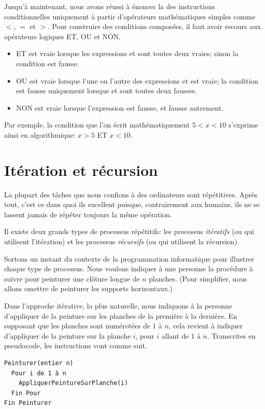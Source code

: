 Jusqu'à maintenant, nous avons réussi à énoncer la 
des instructions conditionnelles uniquement à partir d'opérateurs
mathématiques simples comme $<$, $=$ et $>$. Pour construire des
conditions composées, il faut avoir recours aux opérateurs logiques
ET, OU et NON.
\begin{itemize}
\item {} ET  est vraie lorsque les expressions
   et  sont toutes deux vraies; sinon la
  condition est fausse.
\item {} OU  est vraie lorsque l'une ou l'autre
  des expressions  et  est vraie; la condition
  est fausse uniquement lorsque  et  sont
  toutes deux fausses.
\item NON  est vraie lorsque l'expression  est fausse,
  et fausse autrement.
\end{itemize}

Par exemple, la condition que l'on écrit mathématiquement $5 < x < 10$
s'exprime ainsi en algorithmique: $x > 5$ ET $x < 10$.


\section{Itération et récursion}
\label{sec:algorithmes:iteration}

La plupart des tâches que nous confions à des ordinateurs sont
répétitives. Après tout, c'est ce dans quoi ils excellent puisque,
contrairement aux humains, ils ne se lassent jamais de répéter
toujours la même opération.

Il existe deux grands types de processus répétitifs: les processus
\emph{itératifs} (ou qui utilisent
l'itération) et les processus
\emph{récursifs} (ou qui utilisent la
récursion).

Sortons un instant du contexte de la programmation informatique pour
illustrer chaque type de processus. Nous voulons indiquer à une
personne la procédure à suivre pour peinturer une clôture longue de
$n$ planches. (Pour simplifier, nous allons omettre de peinturer les
supports horizontaux.)

Dans l'approche itérative, la plus naturelle, nous indiquons à la
personne d'appliquer de la peinture sur les planches de la première à
la dernière. En supposant que les planches sont numérotées de $1$ à
$n$, cela revient à indiquer d'appliquer de la peinture sur la planche
$i$, pour $i$ allant de $1$ à $n$. Transcrites en pseudocode, les
instructions vont comme suit.
\begin{pseudocode}
\begin{Verbatim}
Peinturer(entier n)
  Pour i de 1 à n
    AppliquerPeintureSurPlanche(i)
  Fin Pour
Fin Peinturer
\end{Verbatim}
\end{pseudocode}


